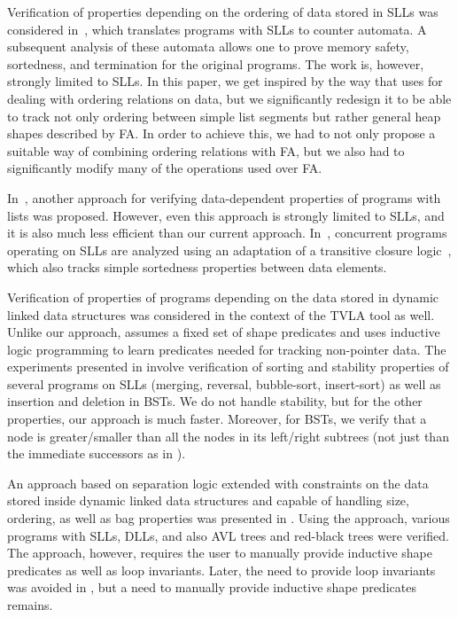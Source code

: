 Verification of properties depending on the ordering of data stored in SLLs was
considered in~\cite{lists-counters}, which translates programs with SLLs to
counter automata. A subsequent analysis of these automata allows one to prove
memory safety, sortedness, and termination for the original programs. The work
is, however, strongly limited to SLLs. In this paper, we get inspired by the way
that \cite{lists-counters} uses for dealing with ordering relations on data, but
we significantly redesign it to be able to track not only ordering between
simple list segments but rather general heap shapes described by FA. In order to
achieve this, we had to not only propose a suitable way of combining ordering
relations with FA, but we also had to significantly modify many of the
operations used over FA.

In~\cite{atva09}, another approach for verifying data-dependent properties of
programs with lists was proposed. However, even this approach is strongly
limited to SLLs, and it is also much less efficient than our current approach.
In~\cite{haziza:tacas13}, concurrent programs operating on SLLs are analyzed
using an adaptation of a transitive closure logic~\cite{BiRa:vmcai06}, which
also tracks simple sortedness properties between data elements.

Verification of properties of programs depending on the data stored in dynamic
linked data structures was considered in the context of the TVLA tool
\cite{Loginov:AbstrRefViaInductLearning:05} as well. Unlike our approach,
\cite{Loginov:AbstrRefViaInductLearning:05} assumes a fixed set of shape
predicates and uses inductive logic programming to learn predicates needed for
tracking non-pointer data. The experiments presented in
\cite{Loginov:AbstrRefViaInductLearning:05} involve verification of sorting and
stability properties of several programs on SLLs (merging, reversal,
bubble-sort, insert-sort) as well as insertion and deletion in BSTs. We do not
handle stability, but for the other properties, our approach is much faster.
Moreover, for BSTs, we verify that a node is greater/smaller than all the nodes
in its left/right subtrees (not just than the immediate successors as in
\cite{Loginov:AbstrRefViaInductLearning:05}).

An approach based on separation logic extended with constraints on the data
stored inside dynamic linked data structures and capable of handling size,
ordering, as well as bag properties was presented in \cite{sleek12}. Using the
approach, various programs with SLLs, DLLs, and also AVL trees and red-black
trees were verified. The approach, however, requires the user to manually
provide inductive shape predicates as well as loop invariants.  Later, the need
to provide loop invariants was avoided in \cite{sleek13}, but a need to manually
provide inductive shape predicates remains.

